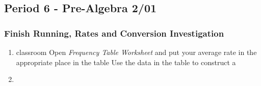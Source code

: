       \subsection[PA2/01]{Period 6 - Pre-Algebra 2/01}
      \begin{frame}[label=PA2_01]
      	   	\frametitle{Finish Running, Rates and Conversion Investigation}
      	   	
      	   	\begin{enumerate}
      	   		\item {} classroom  
      	   		\rightarrowitem Open \emph{Frequency Table Worksheet} and put your average rate in the appropriate place in the table
      	   		\rightarrowitem Use the data in the table to construct a 
      	   		\item \mangahighlogo
      	   	\end{enumerate} 
      	
      \end{frame}
   	 
   	
   	     
   	     
 
   